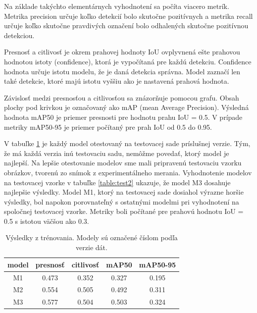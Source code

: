 Na základe takýchto elementárnych vyhodnotení sa počíta viacero metrík. Metrika precision určuje koľko detekcií bolo skutočne pozitívnych a metrika recall určuje koľko skutočne pravdivých označení bolo odhalených skutočne pozitívnou detekciou.

%
%

Presnosť a citlivosť je okrem prahovej hodnoty IoU ovplyvnená ešte prahovou hodnotou istoty (confidence), ktorá je vypočítaná pre každú detekciu. Confidence hodnota určuje istotu modelu, že je daná detekcia správna. Model zaznačí len také detekcie, ktoré majú istotu vyššiu ako je nastavená prahová hodnota.

Závislosť medzi presnosťou a citlivosťou sa znázorňuje pomocou grafu. Obsah plochy pod krivkou je označovaný ako mAP (mean Average Precision). Výsledná hodnota mAP50 je priemer presnosti pre hodnotu prahu IoU = 0.5. V prípade metriky mAP50-95 je priemer počítaný pre prah IoU od 0.5 do 0.95.

V tabuľke \ref{table:test1} je každý model otestovaný na testovacej sade príslušnej verzie. Tým, že má každá verzia inú testovaciu sadu, nemôžme povedať, ktorý model je najlepší. Na lepšie otestovanie modelov sme mali pripravenú testovaciu vzorku obrázkov, tvorenú zo snímok z experimentálneho merania. Vyhodnotenie modelov na testovacej vzorke v tabuľke \ref{table:test2} ukazuje, že model M3 dosahuje najlepšie výsledky. Model M1, ktorý na testovacej sade dosiahol výrazne horšie výsledky, bol napokon porovnateľný s ostatnými modelmi pri vyhodnotení na spoločnej testovacej vzorke. Metriky boli počítané pre prahovú hodnotu IoU = 0.5 s istotou väčšou ako 0.3.

\newpage

\begin{table}[ht]
\centering
\begin{tabular}{ |c c c c c| }
\hline
model & presnosť & citlivosť & mAP50 & mAP50-95 \\
\hline
M1  & 0.473 & 0.352	& 0.327	& 0.195 \\
M2  & 0.554	& 0.505	& 0.492	& 0.311 \\
M3  & 0.577	& 0.504	& 0.503	& 0.324 \\
\hline
\end{tabular}
\caption{Výsledky z trénovania. Modely sú označené číslom podľa verzie dát.}
\label{table:test1}
\end{table}

